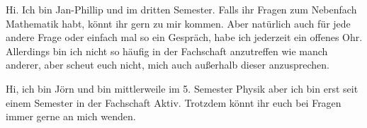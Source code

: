 \begin{multicols*}{2}
{Hi. Ich bin Jan-Phillip und im dritten Semester.
	Falls ihr Fragen zum Nebenfach Mathematik habt, könnt ihr gern zu mir kommen. Aber natürlich auch für jede andere Frage oder einfach mal so ein Gespräch, habe ich jederzeit ein offenes Ohr. Allerdings bin ich nicht so häufig in der Fachschaft anzutreffen wie manch anderer, aber scheut euch nicht, mich auch außerhalb dieser anzusprechen. 
	\vspace{\baselineskip}}

{Hi, ich bin Jörn und bin mittlerweile im 5. Semester Physik
	aber ich bin erst seit einem Semester in der Fachschaft Aktiv.
	Trotzdem könnt ihr euch bei Fragen immer gerne an mich wenden.
	\vspace{\baselineskip}}



\end{multicols*}
